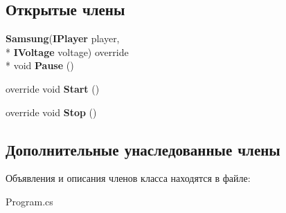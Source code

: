 \subsection*{Открытые члены}
\begin{DoxyCompactItemize}
\item 
{\bf Samsung}({\bf I\-Player} player, \\*
{\bf I\-Voltage} voltage) override \\*
void {\bfseries Pause} ()\label{class_player___power_1_1_samsung_aedd1ed961f6aeba8a9a30c46af4a12f6}

\item 
override void {\bfseries Start} ()\label{class_player___power_1_1_samsung_ae9dc71245f1f468e69dd61adf45f1368}

\item 
override void {\bfseries Stop} ()\label{class_player___power_1_1_samsung_a5f17f99559769aeaff7c78dcf6b29efc}

\end{DoxyCompactItemize}
\subsection*{Дополнительные унаследованные члены}


Объявления и описания членов класса находятся в файле\-:\begin{DoxyCompactItemize}
\item 
Program.\-cs\end{DoxyCompactItemize}

